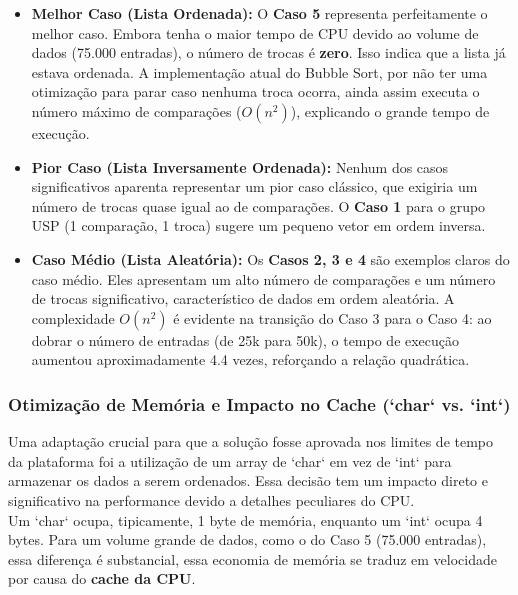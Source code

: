 \begin{itemize}
    \item \textbf{Melhor Caso (Lista Ordenada):} O \textbf{Caso 5} representa perfeitamente o melhor caso. Embora tenha o maior tempo de CPU devido ao volume de dados (75.000 entradas), o número de trocas é \textbf{zero}. Isso indica que a lista já estava ordenada. A implementação atual do Bubble Sort, por não ter uma otimização para parar caso nenhuma troca ocorra, ainda assim executa o número máximo de comparações ($O(n^2)$), explicando o grande tempo de execução.

    \item \textbf{Pior Caso (Lista Inversamente Ordenada):} Nenhum dos casos significativos aparenta representar um pior caso clássico, que exigiria um número de trocas quase igual ao de comparações. O \textbf{Caso 1} para o grupo USP (1 comparação, 1 troca) sugere um pequeno vetor em ordem inversa.
    
    \item \textbf{Caso Médio (Lista Aleatória):} Os \textbf{Casos 2, 3 e 4} são exemplos claros do caso médio. Eles apresentam um alto número de comparações e um número de trocas significativo, característico de dados em ordem aleatória. A complexidade $O(n^2)$ é evidente na transição do Caso 3 para o Caso 4: ao dobrar o número de entradas (de 25k para 50k), o tempo de execução aumentou aproximadamente 4.4 vezes, reforçando a relação quadrática.
\end{itemize}

\subsubsection{Otimização de Memória e Impacto no Cache (`char` vs. `int`)}
Uma adaptação crucial para que a solução fosse aprovada nos limites de tempo da plataforma foi a utilização de um array de `char` em vez de `int` para armazenar os dados a serem ordenados. Essa decisão tem um impacto direto e significativo na performance devido a detalhes peculiares do CPU.
\\
Um `char` ocupa, tipicamente, 1 byte de memória, enquanto um `int` ocupa 4 bytes. Para um volume grande de dados, como o do Caso 5 (75.000 entradas), essa diferença é substancial, essa economia de memória se traduz em velocidade por causa do \textbf{cache da CPU}.

